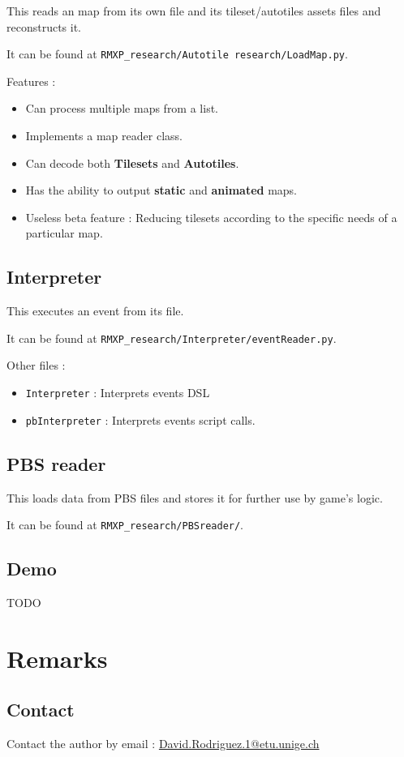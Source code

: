 \documentclass[11pt]{article}
\begin{document}
This reads an map from its own file and its tileset/autotiles assets files and reconstructs it.

It can be found at \verb|RMXP_research/Autotile research/LoadMap.py|. 

Features :
\begin{itemize}
	\item Can process multiple maps from a list.
	\item Implements a map reader class.
	\item Can decode both \textbf{Tilesets} and \textbf{Autotiles}.
	\item Has the ability to output \textbf{static} and \textbf{animated} maps.
	\item Useless beta feature : Reducing tilesets according to the specific needs of a particular map. 
\end{itemize}

\subsection{Interpreter}

This executes an event from its file.

It can be found at \verb|RMXP_research/Interpreter/eventReader.py|. 

Other files :
\begin{itemize}
	\item \verb|Interpreter| : Interprets events DSL
	\item \verb|pbInterpreter| : Interprets events script calls.
\end{itemize}

\subsection{PBS reader}

This loads data from PBS files and stores it for further use by game's logic.

It can be found at \verb|RMXP_research/PBSreader/|. 

\subsection{Demo}

TODO


\newpage
\section{Remarks}

\subsection{Contact}

Contact the author by email : \href{mailto:David.Rodriguez.1@etu.unige.ch}{David.Rodriguez.1@etu.unige.ch}
\end{document}

